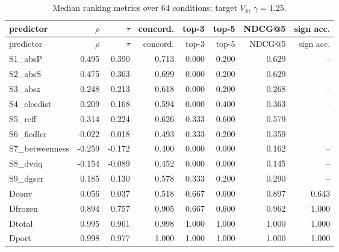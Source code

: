 \documentclass[10pt,a4paper]{article}
\begin{document}
{\scriptsize
\begin{longtable}{lrrrrrrr}
\caption{Median ranking metrics over 64 conditions: target $V_4$, $\gamma=1.25$.}\label{tab:s-bl-H4-1.25-FULL}\\
\toprule
predictor & $\rho$ & $\tau$ & concord. & top-3 & top-5 & NDCG@5 & sign acc. \\
\midrule
\endfirsthead
\toprule
predictor & $\rho$ & $\tau$ & concord. & top-3 & top-5 & NDCG@5 & sign acc. \\
\midrule
\endhead
S1\_absP & 0.495 & 0.390 & 0.713 & 0.000 & 0.200 & 0.629 & -- \\
S2\_absS & 0.475 & 0.363 & 0.699 & 0.000 & 0.200 & 0.629 & -- \\
S3\_absz & 0.248 & 0.213 & 0.618 & 0.000 & 0.200 & 0.268 & -- \\
S4\_elecdist & 0.209 & 0.168 & 0.594 & 0.000 & 0.400 & 0.363 & -- \\
S5\_reff & 0.314 & 0.224 & 0.626 & 0.333 & 0.600 & 0.579 & -- \\
S6\_fiedler & -0.022 & -0.018 & 0.493 & 0.333 & 0.200 & 0.359 & -- \\
S7\_betweenness & -0.259 & -0.172 & 0.400 & 0.000 & 0.000 & 0.162 & -- \\
S8\_dvdq & -0.154 & -0.089 & 0.452 & 0.000 & 0.000 & 0.145 & -- \\
S9\_dgscr & 0.185 & 0.130 & 0.578 & 0.333 & 0.200 & 0.290 & -- \\
Dconv & 0.056 & 0.037 & 0.518 & 0.667 & 0.600 & 0.897 & 0.643 \\
Dfrozen & 0.894 & 0.757 & 0.905 & 0.667 & 0.600 & 0.962 & 1.000 \\
Dtotal & 0.995 & 0.961 & 0.998 & 1.000 & 1.000 & 1.000 & 1.000 \\
Dport & 0.998 & 0.977 & 1.000 & 1.000 & 1.000 & 1.000 & 1.000 \\
\bottomrule
\end{longtable}}
\end{document}
